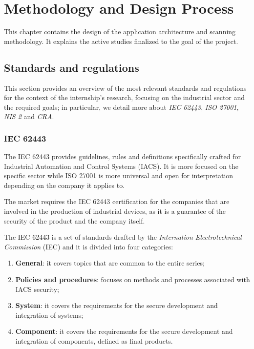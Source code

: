 \chapter{Methodology and Design Process}

This chapter contains the design of the application architecture and scanning methodology. It explains the active studies finalized to the goal of the project.

\section{Standards and regulations}

This section provides an overview of the most relevant standards and regulations for the context of the internship's research, focusing on the industrial sector and the required goals; in particular, we detail more about \textit{IEC 62443}, \textit{ISO 27001}, \textit{NIS 2} and \textit{CRA}.

\subsection{IEC 62443}
\label{sec:iec-62443}

The IEC 62443 provides guidelines, rules and definitions specifically crafted for Industrial Automation and Control Systems (IACS). It is more focused on the specific sector while ISO 27001 is more universal and open for interpretation depending on the company it applies to.

The market requires the IEC 62443 certification for the companies that are involved in the production of industrial devices, as it is a guarantee of the security of the product and the company itself.

The IEC 62443 is a set of standards drafted by the \textit{Internation Electrotechnical Commission} (IEC) and it is divided into four categories:~\cite{iec-62443-parts-understanding}
\begin{enumerate}
  \item \textbf{General}: it covers topics that are common to the entire series;
  \item \textbf{Policies and procedures}: focuses on methods and processes associated with IACS security;
  \item \textbf{System}: it covers the requirements for the secure development and integration of systems;
  \item \textbf{Component}: it covers the requirements for the secure development and integration of components, defined as final products.
\end{enumerate}

